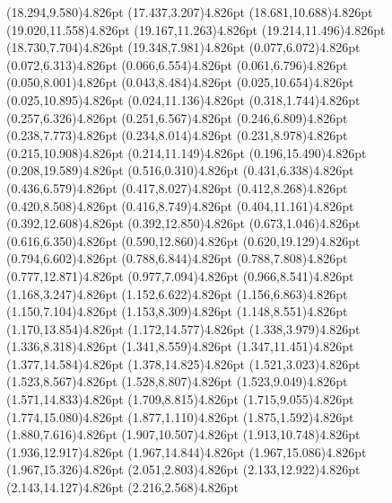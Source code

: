 \documentclass[10pt]{article}
\begin{document}
{{\qdisk(18.294,9.580){4.826pt}%
\qdisk(17.437,3.207){4.826pt}%
\qdisk(18.681,10.688){4.826pt}%
\qdisk(19.020,11.558){4.826pt}%
\qdisk(19.167,11.263){4.826pt}%
\qdisk(19.214,11.496){4.826pt}%
\qdisk(18.730,7.704){4.826pt}%
\qdisk(19.348,7.981){4.826pt}%
\dummycolor
\qdisk(0.077,6.072){4.826pt}%
\qdisk(0.072,6.313){4.826pt}%
\qdisk(0.066,6.554){4.826pt}%
\qdisk(0.061,6.796){4.826pt}%
\qdisk(0.050,8.001){4.826pt}%
\qdisk(0.043,8.484){4.826pt}%
\qdisk(0.025,10.654){4.826pt}%
\qdisk(0.025,10.895){4.826pt}%
\qdisk(0.024,11.136){4.826pt}%
\qdisk(0.318,1.744){4.826pt}%
\qdisk(0.257,6.326){4.826pt}%
\qdisk(0.251,6.567){4.826pt}%
\qdisk(0.246,6.809){4.826pt}%
\qdisk(0.238,7.773){4.826pt}%
\qdisk(0.234,8.014){4.826pt}%
\qdisk(0.231,8.978){4.826pt}%
\qdisk(0.215,10.908){4.826pt}%
\qdisk(0.214,11.149){4.826pt}%
\qdisk(0.196,15.490){4.826pt}%
\qdisk(0.208,19.589){4.826pt}%
\qdisk(0.516,0.310){4.826pt}%
\qdisk(0.431,6.338){4.826pt}%
\qdisk(0.436,6.579){4.826pt}%
\qdisk(0.417,8.027){4.826pt}%
\qdisk(0.412,8.268){4.826pt}%
\qdisk(0.420,8.508){4.826pt}%
\qdisk(0.416,8.749){4.826pt}%
\qdisk(0.404,11.161){4.826pt}%
\qdisk(0.392,12.608){4.826pt}%
\qdisk(0.392,12.850){4.826pt}%
\qdisk(0.673,1.046){4.826pt}%
\qdisk(0.616,6.350){4.826pt}%
\qdisk(0.590,12.860){4.826pt}%
\qdisk(0.620,19.129){4.826pt}%
\qdisk(0.794,6.602){4.826pt}%
\qdisk(0.788,6.844){4.826pt}%
\qdisk(0.788,7.808){4.826pt}%
\qdisk(0.777,12.871){4.826pt}%
\qdisk(0.977,7.094){4.826pt}%
\qdisk(0.966,8.541){4.826pt}%
\qdisk(1.168,3.247){4.826pt}%
\qdisk(1.152,6.622){4.826pt}%
\qdisk(1.156,6.863){4.826pt}%
\qdisk(1.150,7.104){4.826pt}%
\qdisk(1.153,8.309){4.826pt}%
\qdisk(1.148,8.551){4.826pt}%
\qdisk(1.170,13.854){4.826pt}%
\qdisk(1.172,14.577){4.826pt}%
\qdisk(1.338,3.979){4.826pt}%
\qdisk(1.336,8.318){4.826pt}%
\qdisk(1.341,8.559){4.826pt}%
\qdisk(1.347,11.451){4.826pt}%
\qdisk(1.377,14.584){4.826pt}%
\qdisk(1.378,14.825){4.826pt}%
\qdisk(1.521,3.023){4.826pt}%
\qdisk(1.523,8.567){4.826pt}%
\qdisk(1.528,8.807){4.826pt}%
\qdisk(1.523,9.049){4.826pt}%
\qdisk(1.571,14.833){4.826pt}%
\qdisk(1.709,8.815){4.826pt}%
\qdisk(1.715,9.055){4.826pt}%
\qdisk(1.774,15.080){4.826pt}%
\qdisk(1.877,1.110){4.826pt}%
\qdisk(1.875,1.592){4.826pt}%
\qdisk(1.880,7.616){4.826pt}%
\qdisk(1.907,10.507){4.826pt}%
\qdisk(1.913,10.748){4.826pt}%
\qdisk(1.936,12.917){4.826pt}%
\qdisk(1.967,14.844){4.826pt}%
\qdisk(1.967,15.086){4.826pt}%
\qdisk(1.967,15.326){4.826pt}%
\qdisk(2.051,2.803){4.826pt}%
\qdisk(2.133,12.922){4.826pt}%
\qdisk(2.143,14.127){4.826pt}%
\qdisk(2.216,2.568){4.826pt}%
}}
\end{document}
